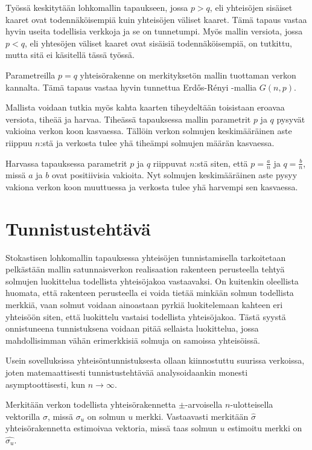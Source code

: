 \documentclass[finnish,12pt,a4paper,pdftex,sci,utf8]{aaltothesis}
\begin{document}
Työssä keskitytään lohkomallin tapaukseen, jossa $p > q$, eli yhteisöjen sisäiset kaaret ovat todennäköisempiä kuin yhteisöjen väliset kaaret. Tämä tapaus vastaa hyvin useita todellisia verkkoja ja se on tunnetumpi. Myös mallin versiota, jossa $p < q$, eli yhtesöjen väliset kaaret ovat sisäisiä todennäköisempiä, on tutkittu, mutta sitä ei käsitellä tässä työssä.

Parametreilla $p = q$ yhteisörakenne on merkityksetön mallin tuottaman verkon kannalta. Tämä tapaus vastaa hyvin tunnettua Erdős-Rényi -mallia $G(n,p)$.

Mallista voidaan tutkia myös kahta kaarten tiheydeltään toisistaan eroavaa versiota, tiheää ja harvaa. Tiheässä tapauksessa mallin parametrit $p$ ja $q$ pysyvät vakioina verkon koon kasvaessa. Tällöin verkon solmujen keskimääräinen aste riippuu $n$:stä ja verkosta tulee yhä tiheämpi solmujen määrän kasvaessa.

Harvassa tapauksessa parametrit $p$ ja $q$ riippuvat $n$:stä siten, että $p = \frac{a}{n}$ ja $q = \frac{b}{n}$, missä $a$ ja $b$ ovat positiivisia vakioita. Nyt solmujen keskimääräinen aste pysyy vakiona verkon koon muuttuessa ja verkosta tulee yhä harvempi sen kasvaessa.

\clearpage

\section{Tunnistustehtävä}

Stokastisen lohkomallin tapauksessa yhteisöjen tunnistamisella tarkoitetaan pelkästään mallin satunnaisverkon realisaation rakenteen perusteella tehtyä solmujen luokittelua todellista yhteisöjakoa vastaavaksi. On kuitenkin oleellista huomata, että rakenteen perusteella ei voida tietää minkään solmun todellista merkkiä, vaan solmut voidaan ainoastaan pyrkiä luokitelemaan kahteen eri yhteisöön siten, että luokittelu vastaisi todellista yhteisöjakoa. Tästä syystä onnistuneena tunnistuksena voidaan pitää sellaista luokittelua, jossa mahdollisimman vähän erimerkkisiä solmuja on samoissa yhteisöissä.

Usein sovelluksissa yhteisöntunnistuksesta ollaan kiinnostuttu suurissa verkoissa, joten matemaattisesti tunnistustehtävää analysoidaankin monesti asymptoottisesti, kun $n \rightarrow \infty$.

Merkitään verkon todellista yhteisörakennetta ${\pm}$-arvoisella $n$-ulotteisella vektorilla $\sigma$, missä $\sigma_u$ on solmun $u$ merkki. Vastaavasti merkitään $\hat{\sigma}$ yhteisörakennetta estimoivaa vektoria, missä taas solmun $u$ estimoitu merkki on $\hat{\sigma_u}$.
\end{document}
